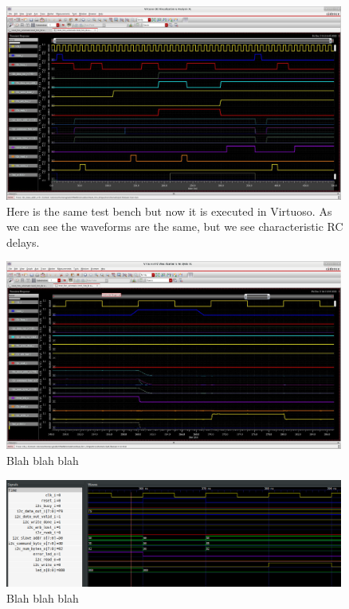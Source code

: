 \documentclass[11pt]{article}
\begin{document}
\begin{figure}[H]
    \centering
\includegraphics[width=0.99\textwidth]{waveforms.png}
    \caption{Here is the same test bench but now it is executed in Virtuoso. As we can see the waveforms are the same, but we see characteristic RC delays.}
\end{figure}


\begin{figure}[H]
    \centering
\includegraphics[width=0.99\textwidth]{disc1.png}
    \caption{Blah blah blah}
\end{figure}


\begin{figure}[H]
    \centering
\includegraphics[width=0.99\textwidth]{disc2.png}
    \caption{Blah blah blah}
\end{figure}
\end{document}
